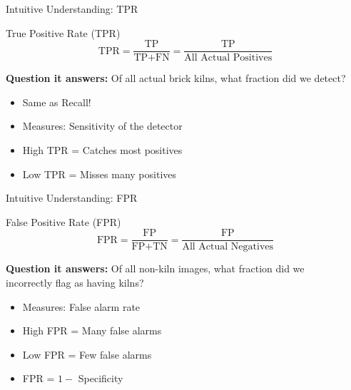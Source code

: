 \documentclass{beamer}
\begin{document}
\begin{frame}{Intuitive Understanding: TPR}
\begin{examplebox}{True Positive Rate (TPR)}
$$\text{TPR} = \frac{\text{TP}}{\text{TP} + \text{FN}} = \frac{\text{TP}}{\text{All Actual Positives}}$$

\vspace{0.2cm}

\textbf{Question it answers:}
Of all actual brick kilns, what fraction did we detect?
\end{examplebox}

\vspace{0.3cm}

\begin{itemize}
    \item Same as Recall!
    \item Measures: Sensitivity of the detector
    \item High TPR = Catches most positives
    \item Low TPR = Misses many positives
\end{itemize}
\end{frame}

\begin{frame}{Intuitive Understanding: FPR}
\begin{examplebox}{False Positive Rate (FPR)}
$$\text{FPR} = \frac{\text{FP}}{\text{FP} + \text{TN}} = \frac{\text{FP}}{\text{All Actual Negatives}}$$

\vspace{0.2cm}

\textbf{Question it answers:}
Of all non-kiln images, what fraction did we \\
incorrectly flag as having kilns?
\end{examplebox}

\vspace{0.3cm}

\begin{itemize}
    \item Measures: False alarm rate
    \item High FPR = Many false alarms
    \item Low FPR = Few false alarms
    \item FPR = $1 - $ Specificity
\end{itemize}
\end{frame}
\end{document}
